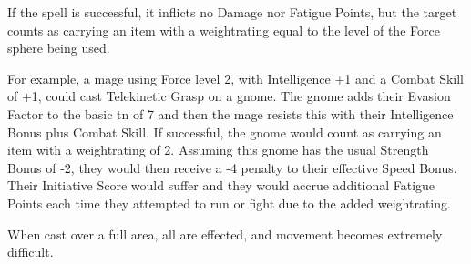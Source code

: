\begin{multicols}{2}
If the spell is successful, it inflicts no Damage nor Fatigue Points, but the target counts as carrying an item with a \gls{weightrating} equal to the level of the Force sphere being used.

For example, a mage using Force level 2, with Intelligence +1 and a Combat Skill of +1, could cast Telekinetic Grasp on a gnome.
The gnome adds their Evasion Factor to the basic \gls{tn} of 7 and then the mage resists this with their Intelligence Bonus plus Combat Skill.
If successful, the gnome would count as carrying an item with a \gls{weightrating} of 2.
Assuming this gnome has the usual Strength Bonus of -2, they would then receive a -4 penalty to their effective Speed Bonus.
Their Initiative Score would suffer and they would accrue additional Fatigue Points each time they attempted to run or fight due to the added \gls{weightrating}.

When cast over a full area, all are effected, and movement becomes extremely difficult.



\end{multicols}


